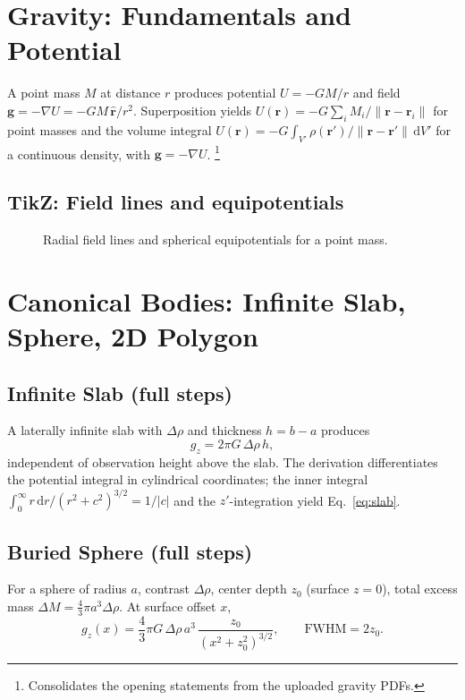 \documentclass[11pt,a4paper]{article}
\begin{document}
\section{Gravity: Fundamentals and Potential}
A point mass $M$ at distance $r$ produces potential $U=-GM/r$ and field $\mathbf{g}=-\nabla U= -GM\,\hat{\mathbf{r}}/r^2$. Superposition yields $U(\mathbf{r})=-G\sum_i M_i/\|\mathbf{r}-\mathbf{r}_i\|$ for point masses and the volume integral $U(\mathbf{r})=-G \int_{V'} \rho(\mathbf{r'})/\|\mathbf{r}-\mathbf{r'}\|\,\mathrm{d}V'$ for a continuous density, with $\mathbf{g}=-\nabla U$.
\footnote{Consolidates the opening statements from the uploaded gravity PDFs.}

\subsection*{TikZ: Field lines and equipotentials}
\begin{figure}[h]
\centering
{}
\caption{Radial field lines and spherical equipotentials for a point mass.}
\end{figure}

\section{Canonical Bodies: Infinite Slab, Sphere, 2D Polygon}
\subsection{Infinite Slab (full steps)}
A laterally infinite slab with $\Delta\rho$ and thickness $h=b-a$ produces
\begin{equation}
  g_z = 2\pi G\,\Delta\rho\,h,\label{eq:slab}
\end{equation}
independent of observation height above the slab. The derivation differentiates the potential integral in cylindrical coordinates; the inner integral $\int_0^{\infty} r\,\mathrm{d}r/(r^2+c^2)^{3/2}=1/|c|$ and the $z'$-integration yield Eq.~\eqref{eq:slab}.

\subsection{Buried Sphere (full steps)}
For a sphere of radius $a$, contrast $\Delta\rho$, center depth $z_0$ (surface $z=0$), total excess mass $\Delta M=\tfrac{4}{3}\pi a^3\Delta\rho$. At surface offset $x$,
\begin{equation}
  g_z(x)= \frac{4}{3}\pi G\,\Delta\rho\,a^3\,\frac{z_0}{(x^2+z_0^2)^{3/2}},\qquad \text{FWHM}=2z_0.
\end{equation}
\end{document}
